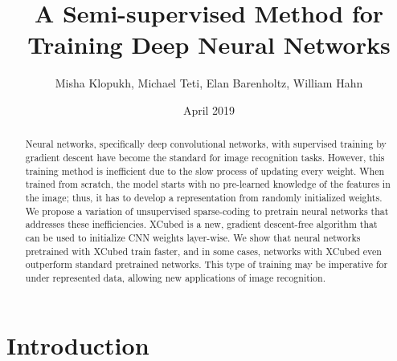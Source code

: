 \documentclass[twocolumn]{article}
\title{A Semi-supervised Method for Training Deep Neural Networks}
\author{Misha Klopukh, Michael Teti, Elan Barenholtz, William Hahn}
\affil{Machine Perception and Cognitive Robotics Laboratory, Florida Atlantic University}
\date{April 2019}
\begin{document}
\maketitle




\begin{abstract}
    Neural networks, specifically deep convolutional networks, with supervised training by gradient descent have become the standard for image recognition tasks. However, this training method is inefficient due to the slow process of updating every weight. When trained from scratch, the model starts with no pre-learned knowledge of the features in the image; thus, it has to develop a representation from randomly initialized weights. We propose a variation of unsupervised sparse-coding to pretrain neural networks that addresses these inefficiencies. XCubed is a new, gradient descent-free algorithm that can be used to initialize CNN weights layer-wise. We show that neural networks pretrained with XCubed train faster, and in some cases, networks with XCubed even outperform standard pretrained networks. This type of training may be imperative for under represented data, allowing new applications of image recognition.
\end{abstract}


\section{Introduction}
\end{document}
